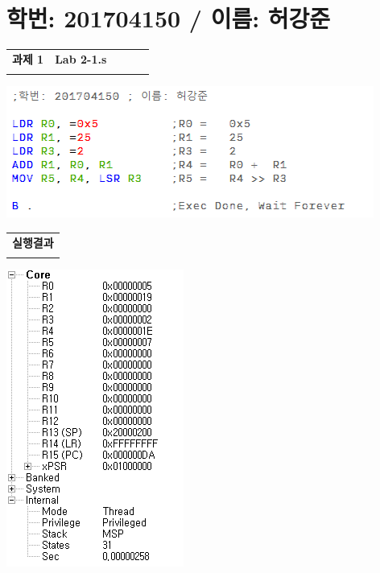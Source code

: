 \documentclass{article}
\begin{document}
\section*{학번: 201704150 / 이름: 허강준}

\begin{table}[htbp]
    \begin{tabularx}{\linewidth}{@{\extracolsep{\fill} }
        >{\centering}p{0.3\linewidth}
        p{0.7\linewidth} }
    \Xhline{3\arrayrulewidth}
    \textbf{과제 1} & \textbf{Lab 2-1.s} \\ \Xhline{3\arrayrulewidth}
    \end{tabularx}
\end{table}

\begin{center}
\includegraphics{result/lab2-1-src.PNG}
\end{center}

\begin{table}[htbp]
    \begin{tabularx}{\textwidth}{@{\extracolsep{\fill} }
        p{\linewidth}}
    \Xhline{3\arrayrulewidth}
    \textbf{실행결과} \\ \Xhline{3\arrayrulewidth}
    \end{tabularx}
\end{table}

\begin{center}
\includegraphics{result/lab2-1-reg.PNG}
\end{center}
\end{document}
